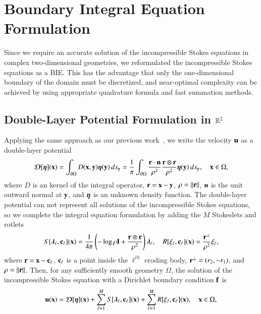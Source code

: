 \documentclass[preprint,10pt]{elsarticle}
\begin{document}
\section{Boundary Integral Equation Formulation}
\label{sec:DLP}
Since we require an accurate solution of the incompressible Stokes
equations in complex two-dimensional geometries, we reformulated the
incompressible Stokes equations as a BIE.  This has the advantage that
only the one-dimensional boundary of the domain must be discretized, and
near-optimal complexity can be achieved by using appropriate quadrature
formula and fast summation methods.

\subsection{Double-Layer Potential Formulation in ${\mathbb{R}}^2$}
Applying the same approach as our previous work~\cite{qua-moo2018}, we
write the velocity ${\mathbf{u}}$ as a double-layer potential 
\begin{align}
  {\boldsymbol{\mathcal D}}[{\boldsymbol\eta}]({\mathbf{x}}) = \int_{{\partial}\Omega} D({\mathbf{x}},{\mathbf{y}}) {\boldsymbol\eta}({\mathbf{y}})\, ds_{\mathbf{y}} = 
  \frac{1}{\pi}\int_{{\partial}\Omega} 
    \frac{{\mathbf{r}} \cdot {\mathbf{n}}}{\rho^2} \frac{{\mathbf{r}} \otimes {\mathbf{r}}}{\rho^2}
    {\boldsymbol\eta}({\mathbf{y}}) \, ds_{\mathbf{y}}, \quad {\mathbf{x}} \in \Omega,
  \label{eqn:velocityDLP}
\end{align}
where $D$ is an kernel of the integral operator, ${\mathbf{r}} = {\mathbf{x}} - {\mathbf{y}}$,
$\rho = \|{\mathbf{r}}\|$, ${\mathbf{n}}$ is the unit outward normal at ${\mathbf{y}}$, and ${\boldsymbol\eta}$
is an unknown density function.  The double-layer potential can not
represent all solutions of the incompressible Stokes equations, so we
complete the integral equation formulation by adding the $M$ Stokeslets
and rotlets~\cite{pow-mir1987}
\begin{align}
  S[{\boldsymbol\lambda}_\ell,{\mathbf{c}}_\ell]({\mathbf{x}}) = \frac{1}{4\pi} \left( 
    -\log \rho {\mathbf{I}} + \frac{{\mathbf{r}} \otimes {\mathbf{r}}}{\rho^2}
    \right){\boldsymbol\lambda}_\ell, \quad
  R[\xi_\ell,{\mathbf{c}}_\ell]({\mathbf{x}}) = \frac{{\mathbf{r}}^\perp}{\rho^2} \xi_\ell,
\end{align}
where ${\mathbf{r}} = {\mathbf{x}} - {\mathbf{c}}_\ell$, ${\mathbf{c}}_\ell$ is a point inside the
$\ell^{th}$ eroding body, ${\mathbf{r}}^\perp = (r_2,-r_1)$, and $\rho =
\|{\mathbf{r}}\|$.  Then, for any sufficiently smooth geometry $\Omega$, the
solution of the incompressible Stokes equation with a Dirichlet boundary
condition ${\mathbf{f}}$ is
\begin{align}
  {\mathbf{u}}({\mathbf{x}}) = {\boldsymbol{\mathcal D}}[{\boldsymbol\eta}]({\mathbf{x}}) + 
    \sum_{\ell=1}^M S[{\boldsymbol\lambda}_\ell,{\mathbf{c}}_\ell]({\mathbf{x}}) + 
    \sum_{\ell=1}^M R[\xi_\ell,{\mathbf{c}}_\ell]({\mathbf{x}}), \quad {\mathbf{x}} \in \Omega,
\end{align}
\end{document}
